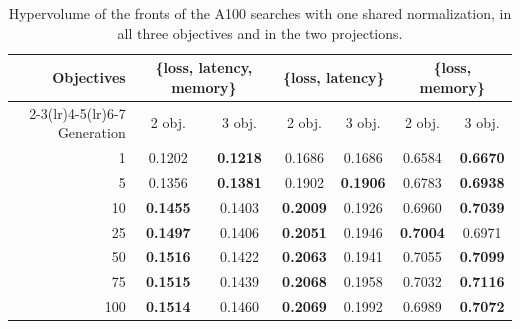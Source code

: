 \documentclass[11pt]{article}
\begin{document}
\begin{table}[htbp]
\centering
\small
\begin{tabular}{rcccccc}
\toprule
Objectives & \multicolumn{2}{c}{\{loss, latency, memory\}} & \multicolumn{2}{c}{\{loss, latency\}} & \multicolumn{2}{c}{\{loss, memory\}} \\
\cmidrule(lr){2-3}\cmidrule(lr){4-5}\cmidrule(lr){6-7}
Generation & 2 obj. & 3 obj. & 2 obj. & 3 obj. & 2 obj. & 3 obj. \\
\midrule
1   & 0.1202          & \textbf{0.1218} & 0.1686          & 0.1686          & 0.6584          & \textbf{0.6670} \\
5   & 0.1356          & \textbf{0.1381} & 0.1902          & \textbf{0.1906} & 0.6783          & \textbf{0.6938} \\
10  & \textbf{0.1455} & 0.1403          & \textbf{0.2009} & 0.1926          & 0.6960          & \textbf{0.7039} \\
25  & \textbf{0.1497} & 0.1406          & \textbf{0.2051} & 0.1946          & \textbf{0.7004} & 0.6971          \\
50  & \textbf{0.1516} & 0.1422          & \textbf{0.2063} & 0.1941          & 0.7055          & \textbf{0.7099} \\
75  & \textbf{0.1515} & 0.1439          & \textbf{0.2068} & 0.1958          & 0.7032          & \textbf{0.7116} \\
100 & \textbf{0.1514} & 0.1460          & \textbf{0.2069} & 0.1992          & 0.6989          & \textbf{0.7072} \\
\bottomrule
\end{tabular}
\caption{Hypervolume of the fronts of the A100 searches with one shared normalization, in all three
objectives and in the two projections.}
\label{tab:a100-hv}
\end{table}
\end{document}
